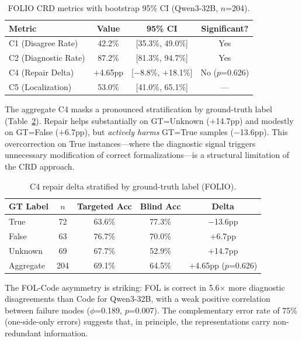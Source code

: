 \documentclass[11pt]{article}
\begin{document}
\begin{table}[t]
\centering
\caption{FOLIO CRD metrics with bootstrap 95\% CI (Qwen3-32B, $n$=204).}
\label{tab:folio_metrics}
\begin{tabular}{lccc}
\toprule
Metric & Value & 95\% CI & Significant? \\
\midrule
C1 (Disagree Rate)   & 42.2\% & [35.3\%, 49.0\%] & Yes \\
C2 (Diagnostic Rate) & 87.2\% & [81.3\%, 94.7\%] & Yes \\
C4 (Repair Delta)    & $+$4.65pp & [$-$8.8\%, $+$18.1\%] & No ($p$=0.626) \\
C5 (Localization)    & 53.0\% & [41.0\%, 65.1\%] & --- \\
\bottomrule
\end{tabular}
\end{table}

The aggregate C4 masks a pronounced stratification by ground-truth label (Table~\ref{tab:folio_gt}). Repair helps substantially on GT=Unknown ($+$14.7pp) and modestly on GT=False ($+$6.7pp), but \emph{actively harms} GT=True samples ($-$13.6pp). This overcorrection on True instances---where the diagnostic signal triggers unnecessary modification of correct formalizations---is a structural limitation of the CRD approach.

\begin{table}[t]
\centering
\caption{C4 repair delta stratified by ground-truth label (FOLIO).}
\label{tab:folio_gt}
\begin{tabular}{lcccc}
\toprule
GT Label & $n$ & Targeted Acc & Blind Acc & Delta \\
\midrule
True    & 72 & 63.6\% & 77.3\% & $-$13.6pp \\
False   & 63 & 76.7\% & 70.0\% & $+$6.7pp \\
Unknown & 69 & 67.7\% & 52.9\% & $+$14.7pp \\
\midrule
Aggregate & 204 & 69.1\% & 64.5\% & $+$4.65pp ($p$=0.626) \\
\bottomrule
\end{tabular}
\end{table}

The FOL-Code asymmetry is striking: FOL is correct in 5.6$\times$ more diagnostic disagreements than Code for Qwen3-32B, with a weak positive correlation between failure modes ($\phi$=0.189, $p$=0.007). The complementary error rate of 75\% (one-side-only errors) suggests that, in principle, the representations carry non-redundant information.
\end{document}
